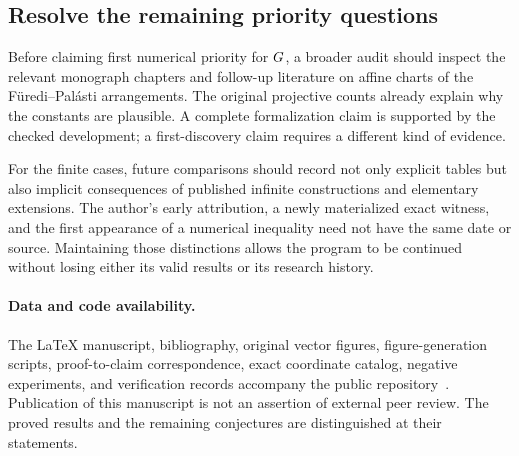 \subsection{Resolve the remaining priority questions}

Before claiming first numerical priority for $G$, a broader audit should inspect the relevant monograph chapters and follow-up literature on affine charts of the F\"uredi--Pal\'asti arrangements. The original projective counts already explain why the constants are plausible. A complete formalization claim is supported by the checked development; a first-discovery claim requires a different kind of evidence.

For the finite cases, future comparisons should record not only explicit tables but also implicit consequences of published infinite constructions and elementary extensions. The author's early attribution, a newly materialized exact witness, and the first appearance of a numerical inequality need not have the same date or source. Maintaining those distinctions allows the program to be continued without losing either its valid results or its research history.

\paragraph{Data and code availability.}
The LaTeX manuscript, bibliography, original vector figures, figure-generation scripts, proof-to-claim correspondence, exact coordinate catalog, negative experiments, and verification records accompany the public repository~\cite{zarzueloRepository}. Publication of this manuscript is not an assertion of external peer review. The proved results and the remaining conjectures are distinguished at their statements.
